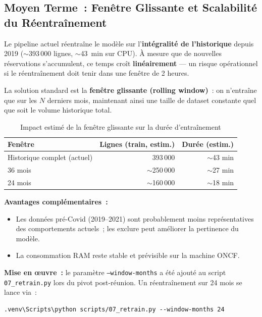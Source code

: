 \documentclass[12pt, a4paper]{report}
\begin{document}
\subsection{Moyen Terme~: Fenêtre Glissante et Scalabilité du Réentraînement}

Le pipeline actuel réentraîne le modèle sur l'\textbf{intégralité de l'historique}
depuis 2019 ($\sim$393\,000 lignes, $\sim$43~min sur CPU). À mesure que de nouvelles
réservations s'accumulent, ce temps croît \textbf{linéairement} --- un risque
opérationnel si le réentraînement doit tenir dans une fenêtre de 2 heures.

La solution standard est la \textbf{fenêtre glissante (rolling window)}~: on
n'entraîne que sur les $N$ derniers mois, maintenant ainsi une taille de
dataset constante quel que soit le volume historique total.

\begin{table}[H]
\centering
\caption{Impact estimé de la fenêtre glissante sur la durée d'entraînement}
\label{tab:rolling-window}
\begin{tabular}{|l|r|r|}
\hline
\textbf{Fenêtre} & \textbf{Lignes (train, estim.)} & \textbf{Durée (estim.)} \\
\hline
Historique complet (actuel) & 393\,000 & $\sim$43 min \\
\hline
36 mois & $\sim$250\,000 & $\sim$27 min \\
\hline
24 mois & $\sim$160\,000 & $\sim$18 min \\
\hline
\end{tabular}
\end{table}

\noindent\textbf{Avantages complémentaires~:}
\begin{itemize}
\item Les données pré-Covid (2019--2021) sont probablement moins représentatives
    des comportements actuels~; les exclure peut améliorer la pertinence du modèle.
\item La consommation RAM reste stable et prévisible sur la machine ONCF.
\end{itemize}

\noindent\textbf{Mise en œuvre~:} le paramètre \texttt{--window-months} a été
ajouté au script \texttt{07\_retrain.py} lors du pivot post-réunion. Un
réentraînement sur 24 mois se lance via~:

\begin{lstlisting}[style=bash]
.venv\Scripts\python scripts/07_retrain.py --window-months 24
\end{lstlisting}
\end{document}
